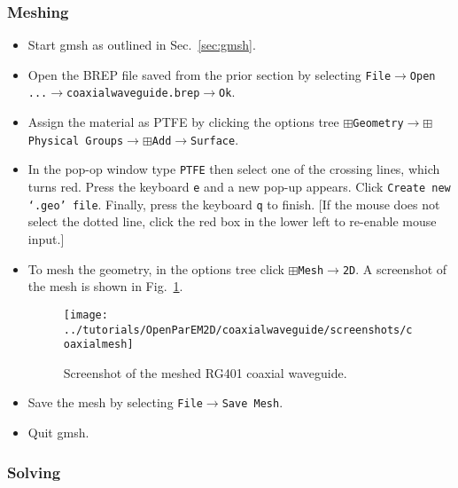 \documentclass[titlepage]{article}
\renewcommand\_{\textunderscore\linebreak[1]}
\begin{document}
\subsubsection{Meshing}

\begin{itemize}
\item Start gmsh as outlined in Sec.~\ref{sec:gmsh}.
\item Open the BREP file saved from the prior section by selecting \newline \texttt{File}$\rightarrow$\texttt{Open ...}$\rightarrow$\texttt{coaxial\_waveguide.brep}$\rightarrow$\texttt{Ok}.
\item Assign the material as PTFE by clicking the options tree \newline$\boxplus$\texttt{Geometry}$\rightarrow$$\boxplus$\texttt{Physical Groups}$\rightarrow$$\boxplus$\texttt{Add}$\rightarrow$\texttt{Surface}.
\item In the pop-op window type \texttt{PTFE} then select one of the crossing lines, which turns red.  Press the keyboard \texttt{e} and a new pop-up appears.  Click \texttt{Create new `.geo' file}.  Finally, press the keyboard \texttt{q} to finish.  [If the mouse does not select the dotted line, click the red box in the lower left to re-enable mouse input.]
\item To mesh the geometry, in the options tree click $\boxplus$\texttt{Mesh}$\rightarrow$\texttt{2D}. A screenshot of the mesh is shown in Fig.~\ref{fig:coaxial_mesh}.
\begin{figure}
  \centering
  \texttt{[image: ../tutorials/OpenParEM2D/coaxial\_waveguide/screenshots/coaxial\_mesh]}
  \caption{Screenshot of the meshed RG401 coaxial waveguide.}
  \label{fig:coaxial_mesh}
\end{figure}
\item Save the mesh by selecting \texttt{File}$\rightarrow$\texttt{Save Mesh}.
\item Quit gmsh.
\end{itemize}

\subsubsection{Solving}
\end{document}
